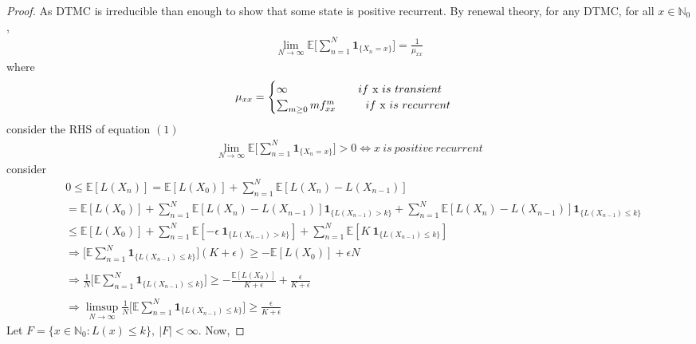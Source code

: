 \documentclass[a4paper,10pt,english]{article}
\begin{document}
\begin{proof}
As DTMC is irreducible than enough to show that some state is positive recurrent.
By renewal theory, for any DTMC, for all $x \in \mathbb{N}_0$,
\begin{align}
\lim\limits_{N \rightarrow \infty} \mathbb{E}\Big[ \sum_{n=1}^{N} \boldsymbol{1}_{\{X_n=x\}} \Big] = \frac{1}{\mu _{xx}} 
\end{align}
where 
\begin{equation*}
\mu _{xx}=
\begin{cases}
	\infty \ \ \ \ \ \ \ \ \ \ \ \ \ \ \ \ \ \ \ if \ $x$ \ is \ transient\\
	\sum_{m \geq 0}m f^{m}_{xx} \ \ \ \ \ \ \ \ if \ $x$ \ is \ recurrent \\
\end{cases}
\end{equation*}
consider the RHS of equation $(1)$
\begin{align*}
\lim\limits_{N \rightarrow \infty} \mathbb{E}\Big[ \sum_{n=1}^{N} \boldsymbol{1}_{\{X_n=x\}} \Big] > 0 \Longleftrightarrow x \ is \ positive \ recurrent  
\end{align*}
consider
\begin{align*}
& 0 \leq \mathbb{E}[L(X_n)] = \mathbb{E}[L(X_0)] +   \sum_{n=1}^{N}\mathbb{E}[L(X_n)-L(X_{n-1})]\\
&= \mathbb{E}[L(X_0)] + \sum_{n=1}^{N}\mathbb{E}[L(X_n)-L(X_{n-1})]\boldsymbol{1}_{\{L(X_{n-1})>k\}} + \sum_{n=1}^{N}\mathbb{E}[L(X_n)-L(X_{n-1})]\boldsymbol{1}_{\{L(X_{n-1})\leq k\}}\\
&\leq \mathbb{E}[L(X_0)] + \sum_{n=1}^{N}\mathbb{E}[-\epsilon \        \boldsymbol{1}_{\{L(X_{n-1})>k\}}] + \sum_{n=1}^{N}\mathbb{E}[K \ \boldsymbol{1}_{\{L(X_{n-1})\leq k\}}]\\
&\Rightarrow \Bigg[\mathbb{E}\sum_{n=1}^{N} \boldsymbol{1}_{\{L(X_{n-1})\leq k\}}\Bigg](K + \epsilon) \geq -\mathbb{E}[L(X_0)] + \epsilon N\\\\
&\Rightarrow \frac{1}{N} \Bigg[\mathbb{E}\sum_{n=1}^{N} \boldsymbol{1}_{\{L(X_{n-1})\leq k\}}\Bigg] \geq -\frac{\mathbb{E}[L(X_0)]}{K+\epsilon} + \frac{\epsilon}{K+\epsilon}\\\\
&\Rightarrow \limsup_{N\rightarrow \infty}\frac{1}{N} \Bigg[\mathbb{E}\sum_{n=1}^{N} \boldsymbol{1}_{\{L(X_{n-1})\leq k\}}\Bigg] \geq \frac{\epsilon}{K+\epsilon}
\end{align*}
Let $F = \{x \in \mathbb{N}_0: L(x) \leq k\}, \ |F| < \infty$. Now,

\end{proof}
\end{document}
